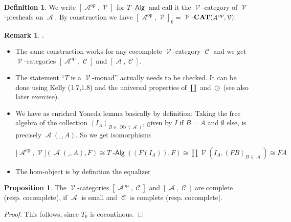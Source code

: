 \documentclass[a4paper,11pt,oneside,openany]{scrbook}
\newcommand{\catname}[1]{{\normalfont\textbf{#1}}}
\DeclareMathOperator{\Alg}{-\mathsf{Alg}}
\newcommand{\CAT}{\catname{CAT}}
\newcommand{\iso}{\cong}
\DeclareMathOperator{\op}{\text{op}}
\DeclareMathOperator{\V}{\mathcal{V}}
\DeclareMathOperator{\A}{\mathcal{A}}
\DeclareMathOperator{\C}{\mathcal{C}}
\DeclareMathOperator{\Ob}{Ob}
\DeclareMathOperator{\copw}{\odot}
\theoremstyle{definition}
\theoremstyle{definition}
\newtheorem{defn}[thm]{Definition} %
\newtheorem{prop}[thm]{Proposition}
\newtheorem{rmk}[thm]{Remark}
\begin{document}
\begin{defn}
   We write $[\A^{\op},\V]$ for $T\Alg$ and call it the $\V$-category of $\V$-presheafs on $\A$. By construction we have 
   $[\A^{\op},\V]_{0} = \V$-$\CAT(\A^{op},\V)$.
\end{defn}

\begin{rmk}:
   \begin{itemize}
      \item[(1)]
         The same construction works for any cocomplete $\V$-category $\C$ and we get $\V$-categories $[\A^{\op},\C]$ and $[\A,\C]$.
      \item[(2)]
         The statement ``$T$ is a $\V$-monad'' actually needs to be checked. It can be done using Kelly (1.7,1.8)   %
         and the universal properties of $\coprod$ and $\copw$ (see also later exercise).
      \item[(3)]
         We have as enriched Yoneda lemma basically by definition: Taking the free algebra of the collection $(I_{A})_{B \in \Ob(\A)}$, given by 
         $I$ if $B=A$ and $\emptyset$ else, is precisely $\A(\_,A)$. So we get isomorphisms 
            \begin{center}
               $\lbrack \A^{\op},\V \rbrack (\A(\_,A),F) \iso T\Alg((F(I_{A})),F) \iso \prod \V(I_{A},(FB)_{B\in \A}) \iso FA$
            \end{center}
      \item[(4)]
         The hom-object is by definition the equalizer
            \begin{center}
            \end{center}
   \end{itemize}
\end{rmk}

\begin{prop}
   The $\V$-categories $[\A^{\op},\C]$ and $[\A,\C]$ are complete (resp. cocomplete), if $\A$ is small and $\C$ is complete (resp. cocomplete).
\end{prop}

\begin{proof}
   This follows, since $T_{0}$ is cocontinous. 
\end{proof}
\end{document}
